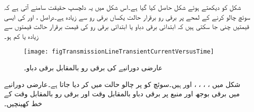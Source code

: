 شکل  کو دیکھتے ہوئے شکل  حاصل کیا گیا ہے۔اس شکل میں یہ دلچسپ حقیقت  سامنے آتی ہے کہ سوئچ چالو کرنے کے لمحے پر برقی رو برقرار حالت یکساں برقی رو سے زیادہ ہے۔دراصل ،  اور  کی ایسی قیمتیں چنی جا سکتی ہیں کہ ابتدائی برقی دباو یا ابتدائی برقی رو کی قیمت برقرار حالت قیمتوں سے زیادہ یا کم ہو۔
\begin{figure}
\centering
\texttt{[image: figTransmissionLineTransientCurrentVersusTime]}
\caption{عارضی دورانیے کی برقی رو بالمقابل برقی دباو۔}
\label{شکل_ترسیلی_عارضی_برقی_رو_بالمقابل_وقت}
\end{figure}

شکل  میں ، ، ، ،  اور  ہیں۔سوئچ کو  پر چالو حالت میں کر دیا جاتا ہے۔عارضی دورانیے میں برقی بوجھ اور منبع  پر برقی دباو بالمقابل وقت اور  برقی رو بالمقابل وقت کے خط کھینچیں۔

